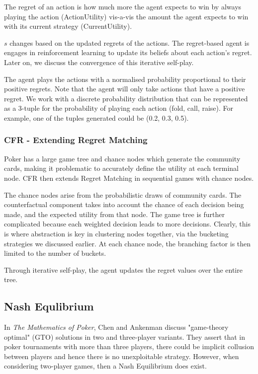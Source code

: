 \documentclass{article}
\begin{document}
The regret of an action is how much more the agent expects to win by always playing the action (ActionUtility) vis-a-vis the amount the agent expects to win with its current strategy (CurrentUtility).

$s$ changes based on the updated regrets of the actions. The regret-based agent is engages in reinforcement learning to update its beliefs about each action's regret. Later on, we discuss the convergence of this iterative self-play.

The agent plays the actions with a normalised probability proportional to their positive regrets. Note that the agent will only take actions that have a positive regret. We work with a discrete probability distribution that can be represented as a 3-tuple for the probability of playing each action (fold, call, raise). For example, one of the tuples generated could be (0.2, 0.3, 0.5).

\subsubsection{CFR - Extending Regret Matching}

Poker has a large game tree and chance nodes which generate the community cards, making it problematic to accurately define the utility at each terminal node. CFR then extends Regret Matching in sequential games with chance nodes.

The chance nodes arise from the probabilistic draws of community cards. The counterfactual component takes into account the chance of each decision being made, and the expected utility from that node. The game tree is further complicated because each weighted decision leads to more decisions. Clearly, this is where abstraction is key in clustering nodes together, via the bucketing strategies we discussed earlier. At each chance node, the branching factor is then limited to the number of buckets.

Through iterative self-play, the agent updates the regret values over the entire tree.

\subsection{Nash Equlibrium}

In \textit{The Mathematics of Poker}, Chen and Ankenman discuss "game-theory optimal" (GTO) solutions in two and three-player variants. They assert that in poker tournaments with more than three players, there could be implicit collusion between players and hence there is no unexploitable strategy. However, when considering two-player games, then a Nash Equilibrium does exist. 
\end{document}
